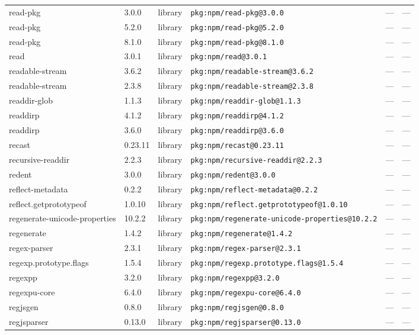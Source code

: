 \documentclass[11pt]{article}
\begin{document}
\begin{longtable}{|l|l|l|p{2.2cm}|l|p{4cm}|}
read-pkg & 3.0.0 & library & \texttt{pkg:npm/read-pkg@3.0.0} & — & — \\
read-pkg & 5.2.0 & library & \texttt{pkg:npm/read-pkg@5.2.0} & — & — \\
read-pkg & 8.1.0 & library & \texttt{pkg:npm/read-pkg@8.1.0} & — & — \\
read & 3.0.1 & library & \texttt{pkg:npm/read@3.0.1} & — & — \\
readable-stream & 3.6.2 & library & \texttt{pkg:npm/readable-stream@3.6.2} & — & — \\
readable-stream & 2.3.8 & library & \texttt{pkg:npm/readable-stream@2.3.8} & — & — \\
readdir-glob & 1.1.3 & library & \texttt{pkg:npm/readdir-glob@1.1.3} & — & — \\
readdirp & 4.1.2 & library & \texttt{pkg:npm/readdirp@4.1.2} & — & — \\
readdirp & 3.6.0 & library & \texttt{pkg:npm/readdirp@3.6.0} & — & — \\
recast & 0.23.11 & library & \texttt{pkg:npm/recast@0.23.11} & — & — \\
recursive-readdir & 2.2.3 & library & \texttt{pkg:npm/recursive-readdir@2.2.3} & — & — \\
redent & 3.0.0 & library & \texttt{pkg:npm/redent@3.0.0} & — & — \\
reflect-metadata & 0.2.2 & library & \texttt{pkg:npm/reflect-metadata@0.2.2} & — & — \\
reflect.getprototypeof & 1.0.10 & library & \texttt{pkg:npm/reflect.getprototypeof@1.0.10} & — & — \\
regenerate-unicode-properties & 10.2.2 & library & \texttt{pkg:npm/regenerate-unicode-properties@10.2.2} & — & — \\
regenerate & 1.4.2 & library & \texttt{pkg:npm/regenerate@1.4.2} & — & — \\
regex-parser & 2.3.1 & library & \texttt{pkg:npm/regex-parser@2.3.1} & — & — \\
regexp.prototype.flags & 1.5.4 & library & \texttt{pkg:npm/regexp.prototype.flags@1.5.4} & — & — \\
regexpp & 3.2.0 & library & \texttt{pkg:npm/regexpp@3.2.0} & — & — \\
regexpu-core & 6.4.0 & library & \texttt{pkg:npm/regexpu-core@6.4.0} & — & — \\
regjsgen & 0.8.0 & library & \texttt{pkg:npm/regjsgen@0.8.0} & — & — \\
regjsparser & 0.13.0 & library & \texttt{pkg:npm/regjsparser@0.13.0} & — & — \\

\end{longtable}
\end{document}
